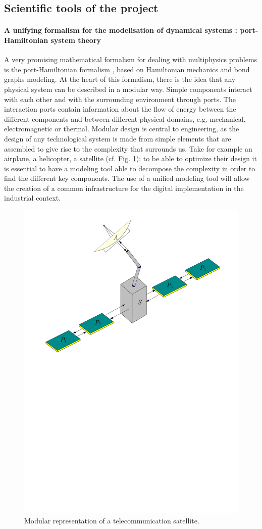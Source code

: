 \documentclass[12pt]{article}
\begin{document}
	
	\subsection{Scientific tools of the project}
	
	\paragraph{A unifying formalism for the modelisation of dynamical systems : port-Hamiltonian system theory\\}

	
	A very promising mathematical formalism for dealing with multiphysics problems is the port-Hamiltonian formalism \cite{vanderSchaft2002}, based on Hamiltonian mechanics and bond graphs modeling. At the heart of this formalism, there is the idea that any physical system can be described in a modular way. Simple components interact with each other and with the surrounding environment through ports. The interaction ports contain information about the flow of energy between the different components and between different physical domains, e.g. mechanical, electromagnetic or thermal. Modular design is central to engineering, as the design of any technological system is made from simple elements that are assembled to give rise to the complexity that surrounds us. Take for example an airplane, a helicopter, a satellite (cf. Fig. \ref{fig:satellite}): to be able to optimize their design it is essential to have a modeling tool able to decompose the complexity in order to find the different key components. The use of a unified modeling tool will allow the creation of a common infrastructure for the digital implementation in the industrial context.



	\begin{figure}[hb]
		\centering
		\includegraphics[width=.55\textwidth]{satellite.pdf}
		\caption{Modular representation of a telecommunication satellite.}
		\label{fig:satellite}
	\end{figure}
	
\end{document}
